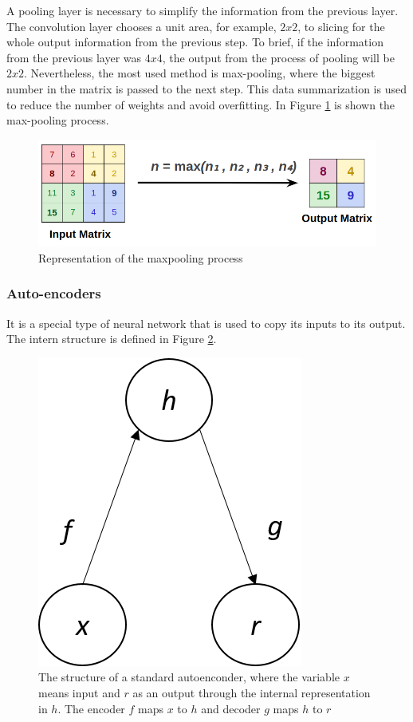 A pooling layer is necessary to simplify the information from the previous layer. The convolution layer chooses a unit area, for example, $2x2$, to slicing for the whole output information from the previous step. To brief, if the information from the previous layer was $4x4$, the output from the process of pooling will be $2x2$. Nevertheless, the most used method is max-pooling, where the biggest number in the matrix is passed to the next step. This data summarization is used to reduce the number of weights and avoid overfitting. In Figure \ref{fig:pooling} is shown the max-pooling process.

\begin{figure}[H]
\centering
\includegraphics[scale=0.35]{imagens/max_pooling.png}
\caption{Representation of the maxpooling process \cite{lecture}}
\label{fig:pooling}
\end{figure}




\subsubsection{Auto-encoders}\label{auto-encoder}

It is a special type of neural network that is used to copy its inputs to its output. The intern structure is defined in Figure \ref{fig:autoencoder}. 

\begin{figure}[H]
\centering
\includegraphics[scale=0.7]{imagens/autoencoder.png}
\caption{The structure of a standard autoenconder, where the variable $x$ means input and $r$ as an output through the internal representation in $h$. The encoder $f$ maps $x$ to $h$ and decoder $g$ maps $h$ to $r$}
\label{fig:autoencoder}
\end{figure}

